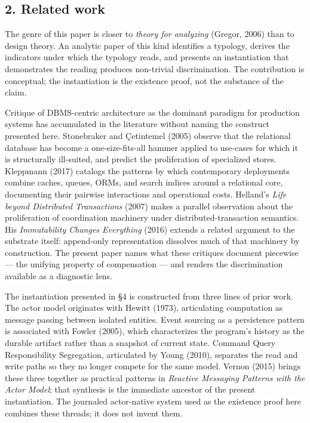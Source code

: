\documentclass[
]{article}
\begin{document}
\subsection{2. Related work}\label{related-work}

The genre of this paper is closer to \emph{theory for analyzing}
(Gregor, 2006) than to design theory. An analytic paper of this kind
identifies a typology, derives the indicators under which the typology
reads, and presents an instantiation that demonstrates the reading
produces non-trivial discrimination. The contribution is conceptual; the
instantiation is the existence proof, not the substance of the claim.

Critique of DBMS-centric architecture as the dominant paradigm for
production systems has accumulated in the literature without naming the
construct presented here. Stonebraker and Çetintemel (2005) observe that
the relational database has become a one-size-fits-all hammer applied to
use-cases for which it is structurally ill-suited, and predict the
proliferation of specialized stores. Kleppmann (2017) catalogs the
patterns by which contemporary deployments combine caches, queues, ORMs,
and search indices around a relational core, documenting their pairwise
interactions and operational costs. Helland's \emph{Life beyond
Distributed Transactions} (2007) makes a parallel observation about the
proliferation of coordination machinery under distributed-transaction
semantics. His \emph{Immutability Changes Everything} (2016) extends a
related argument to the substrate itself: append-only representation
dissolves much of that machinery by construction. The present paper
names what these critiques document piecewise --- the unifying property
of compensation --- and renders the discrimination available as a
diagnostic lens.

The instantiation presented in §4 is constructed from three lines of
prior work. The actor model originates with Hewitt (1973), articulating
computation as message passing between isolated entities. Event sourcing
as a persistence pattern is associated with Fowler (2005), which
characterizes the program's history as the durable artifact rather than
a snapshot of current state. Command Query Responsibility Segregation,
articulated by Young (2010), separates the read and write paths so they
no longer compete for the same model. Vernon (2015) brings these three
together as practical patterns in \emph{Reactive Messaging Patterns with
the Actor Model}; that synthesis is the immediate ancestor of the
present instantiation. The journaled actor-native system used as the
existence proof here combines these threads; it does not invent them.
\end{document}
